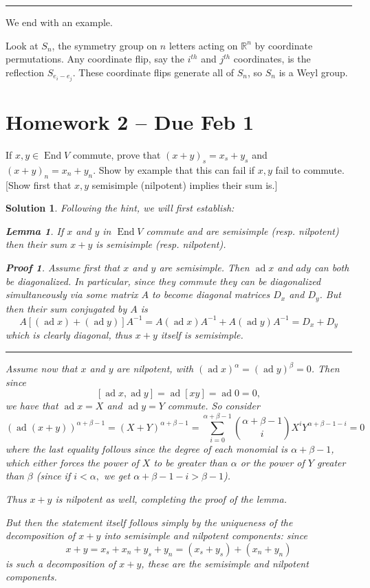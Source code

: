 \documentclass[12pt]{article}
\newenvironment{hwprob}[1]
{\renewcommand{\theprob}{#1}%
 \addtocounter{thm}{-1}%
 \begin{prob}}
{\end{prob}}
\theoremstyle{nonumberbreak}
\newtheorem{sol}{Solution}
\theoremstyle{changebreak}
\newtheorem{lem}[thm]{Lemma}
\theoremstyle{nonumberbreak}
\newtheorem{prf}{Proof}
\theoremstyle{change}
\newcommand*{\R}{
\mathbb{R}
}
\newcommand*{\brk}{
\rule{2in}{.1pt}
}
\DeclareMathOperator{\End}{End}
\DeclareMathOperator{\ad}{ad}
\begin{document}
\brk

We end with an example.

Look at $S_n$, the symmetry group on $n$ letters acting on $\R^n$ by coordinate permutations. Any coordinate flip, 
say the $i^{th}$ and $j^{th}$ coordinates, is the reflection $S_{e_i-e_j}$. These coordinate flips generate all of $S_n$, 
so $S_n$ is a Weyl group.

\newpage

\section*{Homework 2 -- Due Feb 1}
\begin{hwprob}{4.5}
	If $x,y\in\End V$ commute, prove that $(x+y)_s=x_s+y_s$ and $(x+y)_n=x_n+y_n$.
	Show by example that this can fail if $x,y$ fail to commute. [Show first that $x,y$ semisimple (nilpotent) implies their sum is.]
\end{hwprob}
\begin{sol}
	Following the hint, we will first establish:
	\begin{lem}
		If $x$ and $y$ in $\End V$ commute and are semisimple (resp. nilpotent) then their sum $x+y$ is semisimple (resp. nilpotent).
	\end{lem}
	\begin{prf}
		Assume first that $x$ and $y$ are semisimple. Then $\ad x$ and $ad y$ can both be diagonalized. In particular, since they commute
		they can be diagonalized \textit{simultaneously} via some matrix $A$ to become diagonal matrices $D_x$ and $D_y$. But then their sum
		conjugated by $A$ is
		\[A[(\ad x)+(\ad y)]A^{-1}=A(\ad x)A^{-1}+A(\ad y)A^{-1}=D_x+D_y\]
		which is clearly diagonal, thus $x+y$ itself is semisimple.

		\brk

		Assume now that $x$ and $y$ are nilpotent, with $(\ad x)^\alpha=(\ad y)^\beta=0$. Then since
		\[[\ad x,\ad y]=\ad [xy]=\ad 0=0,\]
		we have that $\ad x=X$ and $\ad y=Y$ commute. So consider 
		\[(\ad(x+y))^{\alpha+\beta-1}=(X+Y)^{\alpha+\beta-1}=\sum_{i=0}^{\alpha+\beta-1}\binom{\alpha+\beta-1}{i}X^iY^{\alpha+\beta-1-i}=0\]
		where the last equality follows since the degree of each monomial is $\alpha+\beta-1$, which either forces the power of $X$ to be greater than $\alpha$
		or the power of $Y$ greater than $\beta$ (since if $i<\alpha,$ we get $\alpha+\beta-1-i>\beta-1$).

		Thus $x+y$ is nilpotent as well, completing the proof of the lemma.
	\end{prf}

	But then the statement itself follows simply by the uniqueness of the decomposition of $x+y$ into semisimple and nilpotent components: since 
	\[x+y=x_s+x_n+y_s+y_n=(x_s+y_s)+(x_n+y_n)\]
	is such a decomposition of $x+y$, these are \textit{the} semisimple and nilpotent components.
\end{sol}
\end{document}
